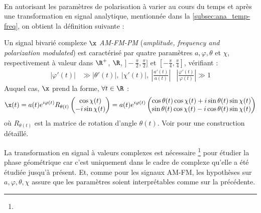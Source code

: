 \\
En autorisant les paramètres de polarisation à varier au cours du temps et après une transformation en signal analytique, mentionnée dans la \cref{subsec:ana_temp-freq}, on obtient la définition suivante :
\\
\begin{definition}[Signal AM-FM-PM] \label{def:AM-FM-PM}
	Un signal bivarié complexe $\x$ \emph{AM-FM-PM} (\emph{amplitude, frequency and polarization modulated}) est caractérisé par quatre paramètres $a,\varphi,\theta$ et $\chi$, respectivement à valeur dans $\R^+$, $\R$, $]-\frac{\pi}{2}, \frac{\pi}{2}]$ et $[-\frac{\pi}{4}, \frac{\pi}{4}]$, vérifiant :
	\begin{align}\label{eq:condi_AM-FM-PM}
		\big| \varphi'(t) \big| &\gg \big| \theta'(t) \big| ,\ \big| \chi'(t) \big| ,\ \left| \frac{a'(t)}{a(t)}\right|  &  \left| \frac{\varphi'(t)}{\varphi(t)}\right| \gg 1
	\end{align}
	Auquel cas, $\x$ prend la forme, $\forall t\in\R$ :
	\begin{equation}\label{eq:AM-FM-PM}
		\x(t) = a(t)e^{i\varphi(t)} R_{\theta(t)} \begin{pmatrix} \cos\chi(t) \\ -i\sin\chi(t) \end{pmatrix} 
		= a(t)e^{i\varphi(t)} \begin{pmatrix} \cos\theta(t) \cos\chi(t) + i\sin\theta(t) \sin\chi(t) \\ \sin\theta(t) \cos\chi(t) - i\cos\theta(t) \sin\chi(t) \end{pmatrix}
	\end{equation}
	où $R_{\theta(t)}$ est la matrice de rotation d'angle $\theta(t)$. Voir \cite[ann. 4.B]{flamant_approche_2018} pour une construction détaillé.
\end{definition}
\skipl

La transformation en signal à valeurs complexes est nécessaire \footnote{
	}
pour étudier la phase géométrique car c'est uniquement dans le cadre de complexe qu'elle a été étudiée jusqu'à présent. 
Et, comme pour les signaux AM-FM, les hypothèses sur $a,\varphi,\theta,\chi$ assure que les paramètres soient interprétables comme sur la  précédente.
\\

